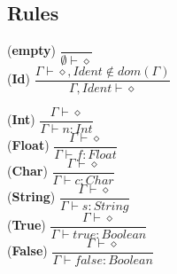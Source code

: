 \documentclass[12pt]{article}
\begin{document}
\subsection*{Rules}
\begin{center}
\noindent (\textbf{empty})
$\dfrac{}{\emptyset \vdash \diamond}$\\[0.2in]
\noindent (\textbf{Id})
$\dfrac{\Gamma \vdash \diamond , Ident \not\in dom(\Gamma)}{\Gamma, Ident \vdash \diamond}$\\[0.1in]
\end{center}

\begin{center}
\noindent(\textbf{Int})
$\dfrac{\Gamma \vdash \diamond}{\Gamma \vdash n : Int}$\\[0.1in]
\noindent(\textbf{Float})
$\dfrac{\Gamma \vdash \diamond}{\Gamma \vdash f : Float}$\\[0.1in]
\noindent(\textbf{Char})
$\dfrac{\Gamma \vdash \diamond}{\Gamma \vdash c : Char}$\\[0.1in]
\noindent(\textbf{String})
$\dfrac{\Gamma \vdash \diamond}{\Gamma \vdash s : String}$\\[0.1in]
\noindent(\textbf{True})
$\dfrac{\Gamma \vdash \diamond}{\Gamma \vdash true : Boolean}$\\[0.1in]
\noindent(\textbf{False})
$\dfrac{\Gamma \vdash \diamond}{\Gamma \vdash false : Boolean}$\\[0.1in]
\end{center}
\end{document}
